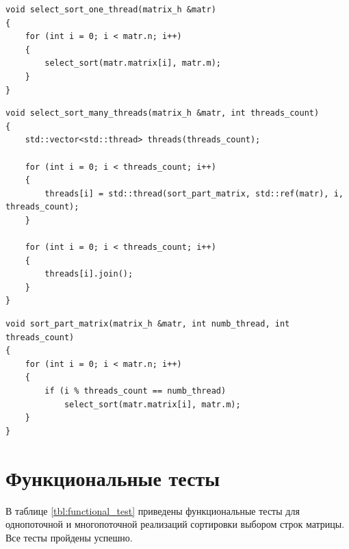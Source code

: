 \documentclass[a4paper,14pt, unknownkeysallowed]{extreport}
\begin{document}
\clearpage

\begin{center}
\captionsetup{justification=raggedright,singlelinecheck=off}
\begin{lstlisting}[label=lst:select_sort_one_thread,caption=Функция однопоточной реализации сортировки выбором строк матрицы]
void select_sort_one_thread(matrix_h &matr)
{
	for (int i = 0; i < matr.n; i++)
	{
		select_sort(matr.matrix[i], matr.m);
	}
}
\end{lstlisting}
\end{center}

\begin{center}
\captionsetup{justification=raggedright,singlelinecheck=off}
\begin{lstlisting}[label=lst:select_sort_many_threads,caption=Функция многопоточной реализации сортировки выбором строк матрицы]
void select_sort_many_threads(matrix_h &matr, int threads_count)
{   
	std::vector<std::thread> threads(threads_count);

	for (int i = 0; i < threads_count; i++)
	{
		threads[i] = std::thread(sort_part_matrix, std::ref(matr), i, threads_count);
	}

	for (int i = 0; i < threads_count; i++)
	{
		threads[i].join();
	}
}
\end{lstlisting}
\end{center}

\begin{center}
\captionsetup{justification=raggedright,singlelinecheck=off}
\begin{lstlisting}[label=lst:sort_part_matrix,caption=Функция сортировки строк части матрицы для отдельного потока]
void sort_part_matrix(matrix_h &matr, int numb_thread, int threads_count)
{
	for (int i = 0; i < matr.n; i++)
	{   
		if (i % threads_count == numb_thread)
			select_sort(matr.matrix[i], matr.m);
	}
}
\end{lstlisting}
\end{center}

\clearpage

\section{Функциональные тесты}

В таблице \ref{tbl:functional_test} приведены функциональные тесты для однопоточной и многопоточной реализаций сортировки выбором строк матрицы. Все тесты пройдены успешно.
\end{document}
